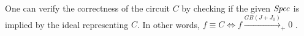 One can verify the correctness of the circuit $C$ by checking
if the given ${\it Spec}$ is implied by the ideal representing 
$C$. In other words, $f \equiv C \iff f\xrightarrow{GB(J+J_0)}_+0$
\cite{lv:tcad2013}. 
